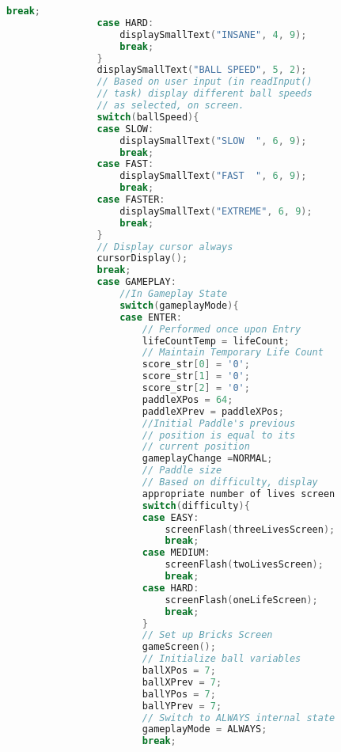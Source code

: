 \documentclass{article}
\begin{document}
\begin{lstlisting}[basicstyle = \small, language = C]
                    break;
                case HARD:
                    displaySmallText("INSANE", 4, 9);
                    break;
                }
                displaySmallText("BALL SPEED", 5, 2);
                // Based on user input (in readInput() 
                // task) display different ball speeds 
                // as selected, on screen.
                switch(ballSpeed){
                case SLOW:
                    displaySmallText("SLOW  ", 6, 9);
                    break;
                case FAST:
                    displaySmallText("FAST  ", 6, 9);
                    break;
                case FASTER:
                    displaySmallText("EXTREME", 6, 9);
                    break;
                }
                // Display cursor always
                cursorDisplay();
                break;
                case GAMEPLAY:
                    //In Gameplay State
                    switch(gameplayMode){
                    case ENTER:
                        // Performed once upon Entry
                        lifeCountTemp = lifeCount; 
                        // Maintain Temporary Life Count
                        score_str[0] = '0';
                        score_str[1] = '0';
                        score_str[2] = '0';
                        paddleXPos = 64;
                        paddleXPrev = paddleXPos; 
                        //Initial Paddle's previous 
                        // position is equal to its 
                        // current position
                        gameplayChange =NORMAL;
                        // Paddle size
                        // Based on difficulty, display 
                        appropriate number of lives screen
                        switch(difficulty){
                        case EASY:
                            screenFlash(threeLivesScreen);
                            break;
                        case MEDIUM:
                            screenFlash(twoLivesScreen);
                            break;
                        case HARD:
                            screenFlash(oneLifeScreen);
                            break;
                        }
                        // Set up Bricks Screen
                        gameScreen();
                        // Initialize ball variables
                        ballXPos = 7;
                        ballXPrev = 7;
                        ballYPos = 7;
                        ballYPrev = 7;
                        // Switch to ALWAYS internal state
                        gameplayMode = ALWAYS;
                        break;

\end{lstlisting}
\end{document}
